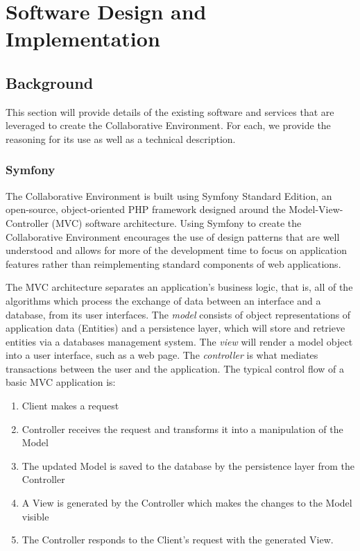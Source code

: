 \chapter{Software Design and Implementation}
\label{chap:software-design}

\section{Background}
This section will provide details of the existing software and services that are leveraged to create the Collaborative Environment. For each, we provide the reasoning for its use as well as a technical description.

\subsection{Symfony}
The Collaborative Environment is built using Symfony Standard Edition, an open-source, object-oriented PHP framework designed around the Model-View-Controller (MVC) software architecture. Using Symfony to create the Collaborative Environment encourages the use of design patterns that are well understood and allows for more of the development time to focus on application features rather than reimplementing standard components of web applications.

The MVC architecture separates an application's business logic, that is, all of the algorithms which process the exchange of data between an interface and a database, from its user interfaces. The \emph{model} consists of object representations of application data (Entities) and a persistence layer, which will store and retrieve entities via a databases management system. The \emph{view} will render a model object into a user interface, such as a web page. The \emph{controller} is what mediates transactions between the user and the application. The typical control flow of a basic MVC application is:

\begin{singlespacing}
\begin{enumerate}
	\item Client makes a request
	\item Controller receives the request and transforms it into a manipulation of the Model
	\item The updated Model is saved to the database by the persistence layer from the Controller
	\item A View is generated by the Controller which makes the changes to the Model visible
	\item The Controller responds to the Client's request with the generated View.
\end{enumerate}
\end{singlespacing}

